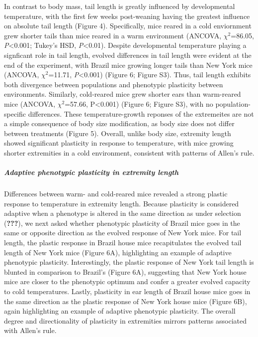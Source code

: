 \documentclass[]{article}
\let\oldsubparagraph\subparagraph
\renewcommand{\subparagraph}[1]{\oldsubparagraph{#1}\mbox{}}
\begin{document}
In contrast to body mass, tail length is greatly influenced by
developmental temperature, with the first few weeks post-weaning having
the greatest influence on absolute tail length (Figure 4). Specifically,
mice reared in a cold enviornment grew shorter tails than mice reared in
a warm environment (ANCOVA, \(\chi^2\)=86.05, \emph{P}\textless{}0.001;
Tukey's HSD, \emph{P}\textless{}0.01). Despite developmental temperature
playing a signficant role in tail length, evolved differences in tail
length were evident at the end of the experiment, with Brazil mice
growing longer tails than New York mice (ANCOVA, \(\chi^2\)=11.71,
\emph{P}\textless{}0.001) (Figure 6; Figure S3). Thus, tail length
exhibits both divergence between populations and phenotypic plasticity
between environments. Similarly, cold-reared mice grew shorter ears than
warm-reared mice (ANCOVA, \(\chi^2\)=57.66, P\textless{}0.001) (Figure
6; Figure S3), with no population-specific differences. These
temperature-growth reponses of the extremeites are not a simple
consequence of body size modification, as body size does not differ
between treatments (Figure 5). Overall, unlike body size, extremity
length showed significant plasticity in response to temperature, with
mice growing shorter extremities in a cold environment, consistent with
patterns of Allen's rule.

\hypertarget{adaptive-phenotypic-plasticity-in-extremity-length}{%
\subparagraph{\texorpdfstring{\emph{Adaptive phenotypic plasticity in
extremity
length}}{Adaptive phenotypic plasticity in extremity length}}\label{adaptive-phenotypic-plasticity-in-extremity-length}}

Differences between warm- and cold-reared mice revealed a strong plastic
response to temperature in extremity length. Because plasticity is
considered adaptive when a phenotype is altered in the same direction as
under selection ({\textbf{???}}), we next asked whether phenotypic
plasticity of Brazil mice goes in the same or opposite direction as the
evolved response of New York mice. For tail length, the plastic response
in Brazil house mice recapitulates the evolved tail length of New York
mice (Figure 6A), highlighting an example of adaptive phenotypic
plasticity. Interestingly, the plastic response of New York tail length
is blunted in comparison to Brazil's (Figure 6A), suggesting that New
York house mice are closer to the phenotypic optimum and confer a
greater evolved capacity to cold temperatures. Lastly, plasticity in ear
length of Brazil house mice goes in the same direction as the plastic
response of New York house mice (Figure 6B), again highlighting an
example of adaptive phenotypic plasticity. The overall degree and
directionality of plasticity in extremities mirrors patterns associated
with Allen's rule.
\end{document}
